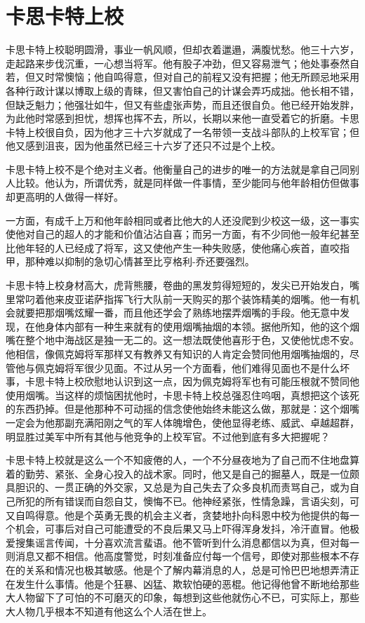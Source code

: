 \chapter{卡思卡特上校}
 
    卡思卡特上校聪明圆滑，事业一帆风顺，但却衣着邋遢，满腹忧愁。他三十六岁，走起路来步伐沉重，一心想当将军。他有股子冲劲，但又容易泄气；他处事泰然自若，但又时常懊恼；他自鸣得意，但对自己的前程又没有把握；他无所顾忌地采用各种行政计谋以博取上级的青睐，但又害怕自己的计谋会弄巧成拙。他长相不错，但缺乏魁力；他强壮如牛，但又有些虚张声势，而且还很自负。他已经开始发胖，为此他时常感到担忧，想挥也挥不去，所以，长期以来他一直受着它的折磨。卡思卡特上校很自负，因为他才三十六岁就成了一名带领一支战斗部队的上校军官；但他又感到沮丧，因为他虽然已经三十六岁了还只不过是个上校。

    卡思卡特上校不是个绝对主义者。他衡量自己的进步的唯一的方法就是拿自己同别人比较。他认为，所谓优秀，就是同样做一件事情，至少能同与他年龄相仿但做事却更高明的人做得一样好。

    一方面，有成千上万和他年龄相同或者比他大的人还没爬到少校这一级，这一事实使他对自己的超人的才能和价值沾沾自喜；而另一方面，有不少同他一般年纪甚至比他年轻的人已经成了将军，这又使他产生一种失败感，使他痛心疾首，直咬指甲，那种难以抑制的急切心情甚至比亨格利-乔还要强烈。

    卡思卡特上校身材高大，虎背熊腰，卷曲的黑发剪得短短的，发尖已开始发白，嘴里常叼着他来皮亚诺萨指挥飞行大队前一天购买的那个装饰精美的烟嘴。他一有机会就要把那烟嘴炫耀一番，而且他还学会了熟练地摆弄烟嘴的手段。他无意中发现，在他身体内部有一种生来就有的使用烟嘴抽烟的本领。据他所知，他的这个烟嘴在整个地中海战区是独一无二的。这一想法既使他喜形于色，又使他忧虑不安。他相信，像佩克姆将军那样又有教养又有知识的人肯定会赞同他用烟嘴抽烟的，尽管他与佩克姆将军很少见面。不过从另一个方面看，他们难得见面也不是什么坏事，卡思卡特上校欣慰地认识到这一点，因为佩克姆将军也有可能压根就不赞同他使用烟嘴。当这样的烦恼困扰他时，卡思卡特上校总强忍住呜咽，真想把这个该死的东西扔掉。但是他那种不可动摇的信念使他始终未能这么做，那就是：这个烟嘴一定会为他那副充满阳刚之气的军人体魄增色，使他显得老练、威武、卓越超群，明显胜过美军中所有其他与他竞争的上校军官。不过他到底有多大把握呢？

 


    卡思卡特上校就是这么一个不知疲倦的人，一个不分昼夜地为了自己而不住地盘算着的勤劳、紧张、全身心投入的战术家。同时，他又是自己的掘墓人，既是一位颇具胆识的、一贯正确的外交家，又总是为自己失去了众多良机而责骂自己，或为自己所犯的所有错误而自怨自艾，懊悔不已。他神经紧张，性情急躁，言语尖刻，可又自鸣得意。他是个英勇无畏的机会主义者，贪婪地扑向科恩中校为他提供的每一个机会，可事后对自己可能遭受的不良后果又马上吓得浑身发抖，冷汗直冒。他极爱搜集谣言传闻，十分喜欢流言蜚语。他不管听到什么消息都信以为真，但对每一则消息又都不相信。他高度警觉，时刻准备应付每一个信号，即使对那些根本不存在的关系和情况也极其敏感。他是个了解内幕消息的人，总是可怜巴巴地想弄清正在发生什么事情。他是个狂暴、凶猛、欺软怕硬的恶棍。他记得他曾不断地给那些大人物留下了可怕的不可磨灭的印象，每想到这些他就伤心不已，可实际上，那些大人物几乎根本不知道有他这么个人活在世上。

